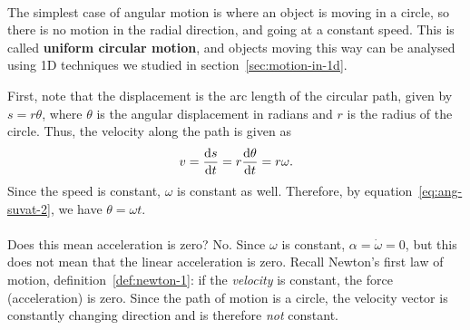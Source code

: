 \documentclass[../classical_mechanics.tex]{subfiles}
\begin{document}
        \paragraph{}
        The simplest case of angular motion is where an object is moving in a circle, so there is no motion in the radial direction, and going at a constant speed.
        This is called \textbf{uniform circular motion}, and objects moving this way can be analysed using 1D techniques we studied in section~\ref{sec:motion-in-1d}.
        \begin{figure}[H]
            \centering
        \end{figure}
        First, note that the displacement is the arc length of the circular path, given by $s=r\theta$, where $\theta$ is the angular displacement in radians and $r$ is the radius of the circle.
        Thus, the velocity along the path is given as
        \begin{equation}\label{eq:ucm-speed}
            v=\dv{s}{t}=r\dv{\theta}{t}=r\omega.
        \end{equation}
        Since the speed is constant, $\omega$ is constant as well.
        Therefore, by equation~\ref{eq:ang-suvat-2}, we have $\theta=\omega t$.

        \paragraph{}
        Does this mean acceleration is zero?
        No.
        Since $\omega$ is constant, $\alpha=\dot{\omega}=0$, but this does not mean that the linear acceleration is zero.
        Recall Newton's first law of motion, definition~\ref{def:newton-1}: if the \textit{velocity} is constant, the force (acceleration) is zero.
        Since the path of motion is a circle, the velocity vector is constantly changing direction and is therefore \textit{not} constant.
\end{document}
